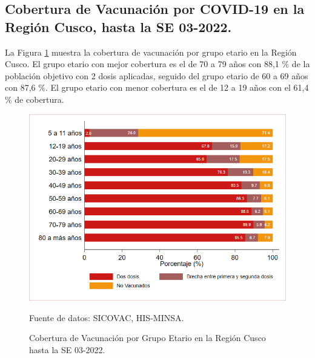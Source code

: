 \documentclass[12pt,a4paper,openany]{book}
\begin{document}
	\subsection*{Cobertura de Vacunación por COVID-19 en la Región Cusco, hasta la SE 03-2022.}
\noindent La Figura \ref{fig:vacuna_edad} muestra la cobertura de vacunación por grupo etario en la Región Cusco. El grupo etario con mejor cobertura es el de 70 a 79 años con 88,1 $\%$ de la población objetivo con 2 dosis aplicadas, seguido del grupo etario de 60 a 69 años con 87,6 $\%$. El grupo etario con menor cobertura es el de 12 a 19 años con el 61,4 $\%$ de cobertura.  

\begin{figure}[h]
	\caption{Cobertura de Vacunación por Grupo Etario en la Región Cusco hasta la SE 03-2022. }\label{fig:vacuna_edad}
	\begin{center}
		\includegraphics[width=0.90\linewidth]{../figuras/vacunacion_grupo_edad.png}
	\end{center}
	{\footnotesize {Fuente de datos: SICOVAC, HIS-MINSA.}}
\end{figure}
\end{document}
